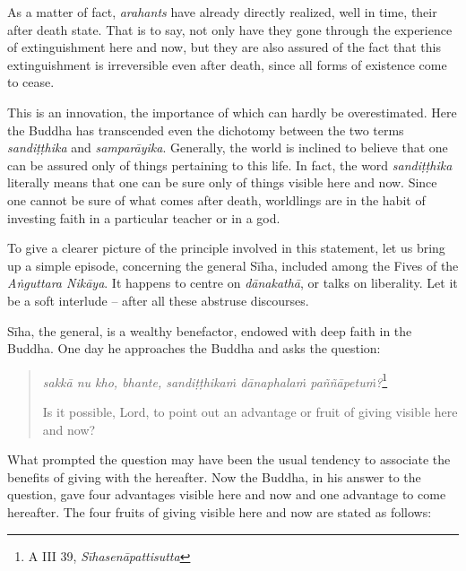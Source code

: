 As a matter of fact, \emph{arahants} have already directly realized, well in time, their after death state. That is to say, not only have they gone through the experience of extinguishment here and now, but they are also assured of the fact that this extinguishment is irreversible even after death, since all forms of existence come to cease.

This is an innovation, the importance of which can hardly be overestimated. Here the Buddha has transcended even the dichotomy between the two terms \emph{sandiṭṭhika} and \emph{samparāyika}. Generally, the world is inclined to believe that one can be assured only of things pertaining to this life. In fact, the word \emph{sandiṭṭhika} literally means that one can be sure only of things visible here and now. Since one cannot be sure of what comes after death, worldlings are in the habit of investing faith in a particular teacher or in a god.

To give a clearer picture of the principle involved in this statement, let us bring up a simple episode, concerning the general Sīha, included among the Fives of the \emph{Aṅguttara Nikāya}. It happens to centre on \emph{dānakathā}, or talks on liberality. Let it be a soft interlude -- after all these abstruse discourses.

Sīha, the general, is a wealthy benefactor, endowed with deep faith in the Buddha. One day he approaches the Buddha and asks the question:

\clearpage

\begin{quote}
\emph{sakkā nu kho, bhante, sandiṭṭhikaṁ dānaphalaṁ paññāpetuṁ?}\footnote{A III 39, \emph{Sīhasenāpattisutta}}

Is it possible, Lord, to point out an advantage or fruit of giving visible here and now?
\end{quote}

What prompted the question may have been the usual tendency to associate the benefits of giving with the hereafter. Now the Buddha, in his answer to the question, gave four advantages visible here and now and one advantage to come hereafter. The four fruits of giving visible here and now are stated as follows:

